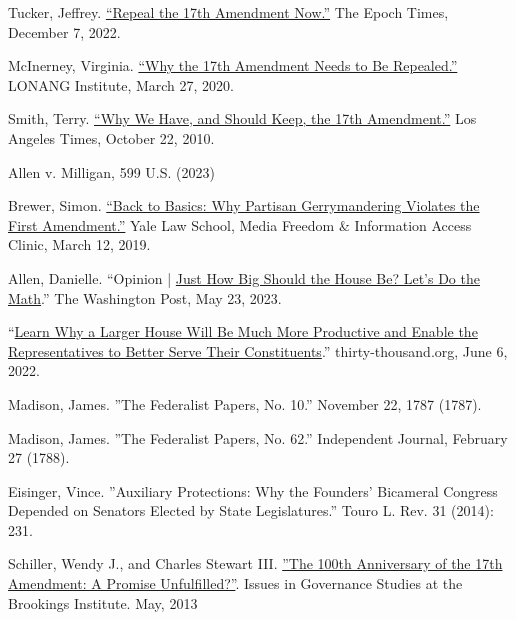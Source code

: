 \documentclass{article}
\begin{document}
\begin{thebibliography}{20}
Tucker, Jeffrey. \href{https://www.theepochtimes.com/repeal-the-17th-amendment-now\_4909126.html}{“Repeal the 17th Amendment Now.”} The Epoch Times, December 7, 2022.

McInerney, Virginia. \href{https://lonang.com/commentaries/conlaw/federalism/repeal-seventeenth-amendment/}{“Why the 17th Amendment Needs to Be Repealed.”} LONANG Institute, March 27, 2020.

Smith, Terry. \href{https://www.latimes.com/archives/la-xpm-2010-oct-22-la-oew-smith-17th-amendment-20101022-story.html}{“Why We Have, and Should Keep, the 17th Amendment.”} Los Angeles Times, October 22, 2010.

Allen v. Milligan, 599 U.S. (2023)

Brewer, Simon. \href{https://law.yale.edu/mfia/case-disclosed/back-basics-why-partisan-gerrymandering-violates-first-amendment. }{“Back to Basics: Why Partisan Gerrymandering Violates the First Amendment.”} Yale Law School, Media Freedom \& Information Access Clinic, March 12, 2019.

Allen, Danielle. “Opinion | \href{https://www.washingtonpost.com/opinions/2023/03/28/danielle-allen-democracy-reform-house-representatives-districts/}{Just How Big Should the House Be? Let’s Do the Math}.” The Washington Post, May 23, 2023. 

“\href{https://thirty-thousand.org/the-house-of-representatives-is-scalable/}{Learn Why a Larger House Will Be Much More Productive and Enable the Representatives to Better Serve Their Constituents}.” thirty-thousand.org, June 6, 2022.

Madison, James. ”The Federalist Papers, No. 10.” November 22, 1787 (1787).

Madison, James. ”The Federalist Papers, No. 62.” Independent Journal, February 27 (1788).

Eisinger, Vince. ”Auxiliary Protections: Why the Founders' Bicameral Congress Depended on Senators Elected by State Legislatures.” Touro L. Rev. 31 (2014): 231.

Schiller, Wendy J., and Charles Stewart III. \href{https://www.brookings.edu/wp-content/uploads/2016/06/Schiller_17th-Amendment_v7.pdf}{”The 100th Anniversary of the 17th Amendment: A Promise Unfulfilled?”}. Issues in Governance Studies at the Brookings Institute. May, 2013


\end{thebibliography}
\end{document}
